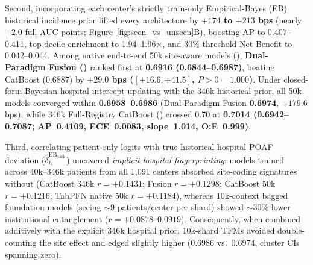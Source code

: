 Second, incorporating each center's strictly train-only Empirical-Bayes (EB) historical incidence prior lifted every architecture by \textbf{$+174$ to $+213$ bps} (nearly $+2.0$ full AUC points; Figure~\ref{fig:seen_vs_unseen}B), boosting AP to 0.407--0.411, top-decile enrichment to 1.94--1.96$\times$, and 30\%-threshold Net Benefit to 0.042--0.044. Among native end-to-end 50k site-aware models (), \textbf{Dual-Paradigm Fusion ()} ranked first at \textbf{0.6916 (0.6844--0.6987)}, beating CatBoost  (0.6887) by \textbf{$+29.0$ bps ($[+16.6, +41.5]$, $P>0=1.000$)}. Under closed-form Bayesian hospital-intercept updating with the 346k historical prior, all 50k models converged within \textbf{0.6958--0.6986} (Dual-Paradigm Fusion \textbf{0.6974}, $+179.6$ bps), while 346k Full-Registry CatBoost () crossed 0.70 at \textbf{0.7014 (0.6942--0.7087; AP~0.4109, ECE~0.0083, slope~1.014, O:E~0.999)}.

Third, correlating patient-only logits with true historical hospital POAF deviation ($\hat{\delta}_h^{\mathrm{EB}_{346\mathrm{k}}}$) uncovered \emph{implicit hospital fingerprinting}: models trained across 40k--346k patients from all 1,091 centers absorbed site-coding signatures without  (CatBoost 346k $r=+0.1431$; Fusion $r=+0.1298$; CatBoost 50k $r=+0.1216$; TabPFN native 50k $r=+0.1184$), whereas 10k-context bagged foundation models (seeing $\sim$9 patients/center per shard) showed $\sim$30\% lower institutional entanglement ($r=+0.0878$--$0.0919$). Consequently, when combined additively with the explicit 346k hospital prior, 10k-shard TFMs avoided double-counting the site effect and edged slightly higher (0.6986 vs.\ 0.6974, cluster CIs spanning zero).
